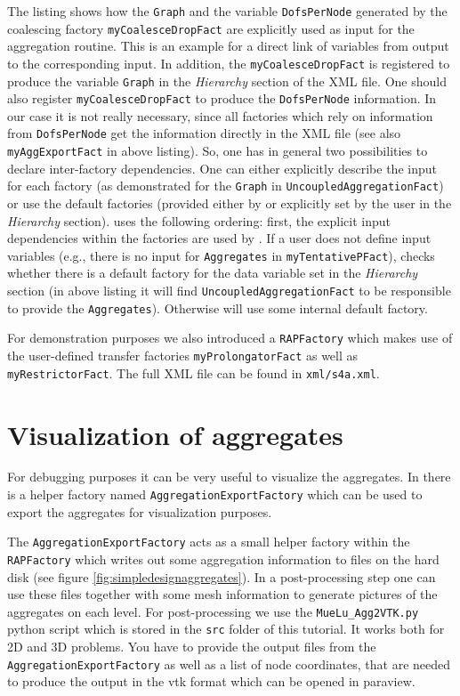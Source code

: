 \documentclass[10pt,fleqn]{book}
\begin{document}
The listing shows how the \verb|Graph| and the variable \verb|DofsPerNode| generated by the coalescing factory \verb|myCoalesceDropFact| are explicitly used as input for the aggregation routine. This is an example for a direct link of variables from output to the corresponding input. In addition, the \verb|myCoalesceDropFact| is registered to produce the variable \verb|Graph| in the \textit{Hierarchy} section of the XML file. One should also register \verb|myCoalesceDropFact| to produce the \verb|DofsPerNode| information. In our case it is not really necessary, since all factories which rely on information from \verb|DofsPerNode| get the information directly in the XML file (see also \verb|myAggExportFact| in above listing). So, one has in general two possibilities to declare inter-factory dependencies. One can either explicitly describe the input for each factory (as demonstrated for the \verb|Graph| in \verb|UncoupledAggregationFact|) or use the default factories (provided either by \muelu or explicitly set by the user in the \textit{Hierarchy} section). \muelu uses the following ordering: first, the explicit input dependencies within the factories are used by \muelu. If a user does not define input variables (e.g., there is no input for \verb|Aggregates| in \verb|myTentativePFact|), \muelu checks whether there is a default factory for the data variable set in the \textit{Hierarchy} section (in above listing it will find \verb|UncoupledAggregationFact| to be responsible to provide the \verb|Aggregates|). Otherwise \muelu will use some internal default factory.

For demonstration purposes we also introduced a \verb|RAPFactory| which makes use of the user-defined transfer factories \verb|myProlongatorFact| as well as \verb|myRestrictorFact|. The full XML file can be found in \verb|xml/s4a.xml|.\\



\section{Visualization of aggregates}

For debugging purposes it can be very useful to visualize the aggregates. In \muelu there is a helper factory named \verb|AggregationExportFactory| which can be used to export the aggregates for visualization purposes.

The \verb|AggregationExportFactory| acts as a small helper factory within the \verb|RAPFactory| which writes out some aggregation information to files on the hard disk (see figure \ref{fig:simpledesignaggregates}). In a post-processing step one can use these files together with some mesh information to generate pictures of the aggregates on each level. For post-processing we use the \verb|MueLu_Agg2VTK.py| python script which is stored in the \texttt{src} folder of this tutorial. It works both for 2D and 3D problems. You have to provide the output files from the \verb|AggregationExportFactory| as well as a list of node coordinates, that are needed to produce the output in the vtk format which can be opened in paraview.
\end{document}
